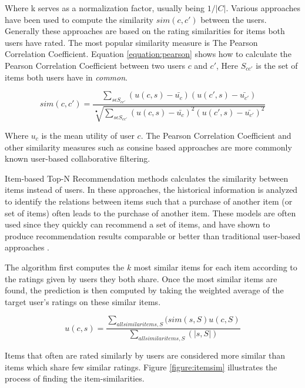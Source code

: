 Where k serves as a normalization factor, usually being $1/|C|$. Various
approaches have been used to compute the similarity $sim(c, c')$ between the
users. Generally these approaches are based on the rating similarities for
items both users have rated. The most popular similarity measure is The Pearson
Correlation Coefficient. Equation \ref{equation:pearson} shows how to calculate
the Pearson Correlation Coefficient between two users $c$ and $c'$, Here
$S_{cc'}$ is the set of items both users have in \emph{common}.

\begin{equation}
sim(c, c') = \frac{\sum_{s \epsilon S_{cc'}} (u(c, s)-\bar{u_{c}})(u(c',s)-\bar{u_{c'}})}{\sqrt[•]{\sum_{s \epsilon S_{cc'}} (u(c, s)-\bar{u_{c}})^{2}(u(c',s)-\bar{u_{c'}})^{2}}}
\label{equation:pearson}
\end{equation}

Where $u_{c}$ is the mean utility of user $c$. The Pearson Correlation
Coefficient and other similarity measures such as consine based approaches are
more commonly known user-based collaborative filtering.\newline

Item-based Top-N Recommendation methods calculates the similarity between items
instead of users. In these approaches, the historical information is analyzed
to identify the relations between items such that a purchase of another item
(or set of items) often leads to the purchase of another item. These models are
often used since they quickly can recommend a set of items, and have shown to
produce recommendation results comparable or better than traditional user-based
approaches \cite{Karypis2001}.

The algorithm first computes the $k$ most similar items for each item according
to the ratings given by users they both share. Once the most similar items are
found, the prediction is then computed by taking the weighted average of the
target user's ratings on these similar items.

\begin{equation}
u(c,s) = \frac{\sum_{all similar items, S} (sim(s,S)u(c, S)}{\sum_{all similar items, S}(|s,S|)}
\end{equation}

Items that often are rated similarly by users are considered more similar than
items which share few similar ratings. Figure \ref{figure:itemsim} illustrates
the process of finding the item-similarities.

